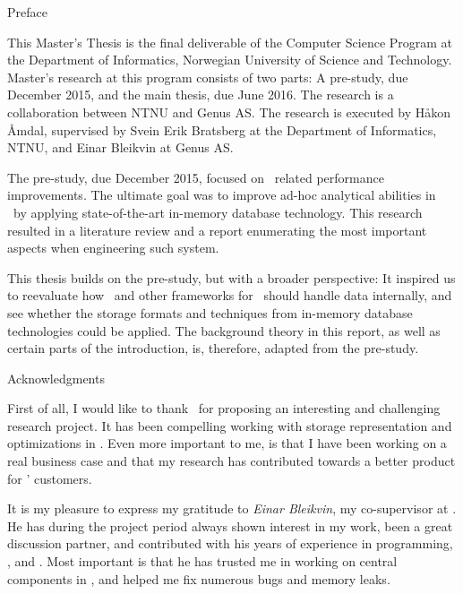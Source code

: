 {\Huge Preface}
\vspace{1cm}

This Master's Thesis is the final deliverable of the Computer Science Program at the Department of Informatics, Norwegian University of Science and Technology. Master's research at this program consists of two parts: A pre-study, due December 2015, and the main thesis, due June 2016. The research is a collaboration between NTNU and Genus AS. The research is executed by Håkon Åmdal, supervised by Svein Erik Bratsberg at the Department of Informatics, NTNU, and Einar Bleikvin at Genus AS.

The pre-study, due December 2015, focused on \bi~related performance improvements. The ultimate goal was to improve ad-hoc analytical abilities in \gap~by applying state-of-the-art in-memory database technology. This research resulted in a literature review and a report enumerating the most important aspects when engineering such system.

This thesis builds on the pre-study, but with a broader perspective: It inspired us to reevaluate how \gap~and other frameworks for \mde~should handle data internally, and see whether the storage formats and techniques from in-memory database technologies could be applied. The background theory in this report, as well as certain parts of the introduction, is, therefore, adapted from the pre-study.

\vspace{1cm}

{\Large Acknowledgments}


First of all, I would like to thank \genus~for proposing an interesting and challenging research project. It has been compelling working with storage representation and optimizations in \gap. Even more important to me, is that I have been working on a real business case and that my research has contributed towards a better product for \genus' customers.

It is my pleasure to express my gratitude to \textit{Einar Bleikvin}, my co-supervisor at \genus. He has during the project period always shown interest in my work, been a great discussion partner, and contributed with his years of experience in programming, \delphi, and \gap. Most important is that he has trusted me in working on central components in \gap, and helped me fix numerous bugs and memory leaks.

